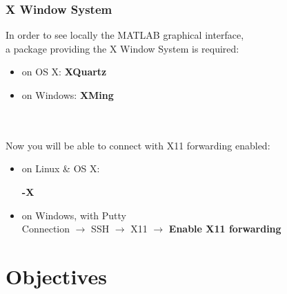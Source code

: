 \documentclass{beamer}
\begin{document}
\begin{frame}[fragile]
\frametitle{X Window System}
  In order to see locally the MATLAB graphical interface, \\
  a package providing the X Window System is required:
  \begin{itemize}
    \item on OS X: \textbf{XQuartz} \hfill{}
    \item on Windows: \textbf{XMing} \hfill{}
  \end{itemize}
  \hfill \\ \hfill \\ %
  
  Now you will be able to connect with X11 forwarding enabled:
  \begin{itemize}
    \item on Linux \& OS X: \\
    \begin{cmdline}
        \textbf{-X}
    \end{cmdline}
    \item on Windows, with Putty \\
     Connection $\rightarrow$ SSH $\rightarrow$ X11 $\rightarrow$ \textbf{Enable X11 forwarding}
  \end{itemize}  
\end{frame}




\section{Objectives}
\end{document}
